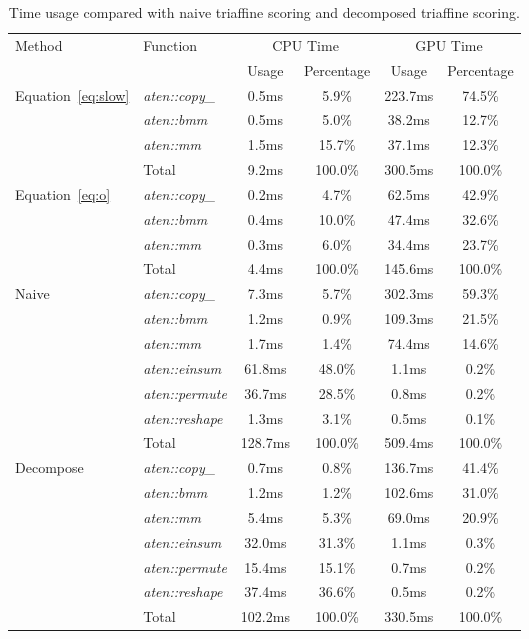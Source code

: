 \documentclass[11pt]{article}
\begin{document}
\begin{table*}[t]
\centering
\small
\begin{tabular}{llcccc}
\toprule
Method & Function &\multicolumn{2}{c}{CPU Time}& \multicolumn{2}{c}{GPU Time} \\
&&Usage&Percentage&Usage&Percentage \\
\midrule
Equation~\ref{eq:slow} & \textit{aten::copy\_} & 0.5ms & 5.9\% & 223.7ms & 74.5\%  \\
      & \textit{aten::bmm} & 0.5ms & 5.0\% & 38.2ms & 12.7\% \\ 
      & \textit{aten::mm} & 1.5ms & 15.7\% & 37.1ms & 12.3\% \\
      & Total & 9.2ms & 100.0\% & 300.5ms & 100.0\% \\
\midrule
Equation~\ref{eq:o} & \textit{aten::copy\_} & 0.2ms & 4.7\% & 62.5ms & 42.9\% \\
      & \textit{aten::bmm} & 0.4ms & 10.0\% & 47.4ms & 32.6\% \\
      & \textit{aten::mm} & 0.3ms & 6.0\% & 34.4ms & 23.7\%  \\
      & Total & 4.4ms & 100.0\% & 145.6ms & 100.0\% \\
\midrule
Naive & \textit{aten::copy\_} & 7.3ms & 5.7\% & 302.3ms & 59.3\% \\
      & \textit{aten::bmm} & 1.2ms & 0.9\% & 109.3ms & 21.5\% \\ 
      & \textit{aten::mm} & 1.7ms & 1.4\% & 74.4ms & 14.6\% \\
      & \textit{aten::einsum} & 61.8ms & 48.0\% & 1.1ms & 0.2\% \\
      & \textit{aten::permute} & 36.7ms & 28.5\% & 0.8ms & 0.2\% \\
      & \textit{aten::reshape} & 1.3ms & 3.1\% & 0.5ms & 0.1\% \\
      & Total & 128.7ms & 100.0\% & 509.4ms & 100.0\% \\
\midrule
Decompose & \textit{aten::copy\_} & 0.7ms & 0.8\% & 136.7ms & 41.4\% \\
      & \textit{aten::bmm} & 1.2ms & 1.2\% & 102.6ms & 31.0\% \\ 
      & \textit{aten::mm} & 5.4ms & 5.3\% & 69.0ms & 20.9\% \\
      & \textit{aten::einsum} & 32.0ms & 31.3\% & 1.1ms & 0.3\% \\
      & \textit{aten::permute} & 15.4ms & 15.1\% & 0.7ms & 0.2\% \\
      & \textit{aten::reshape} & 37.4ms & 36.6\% & 0.5ms & 0.2\% \\
      & Total & 102.2ms & 100.0\% & 330.5ms & 100.0\% \\
\bottomrule      
\end{tabular}
\caption{Time usage compared with naive triaffine scoring and decomposed triaffine scoring.}
\label{table:compare1}
\end{table*}
\end{document}
